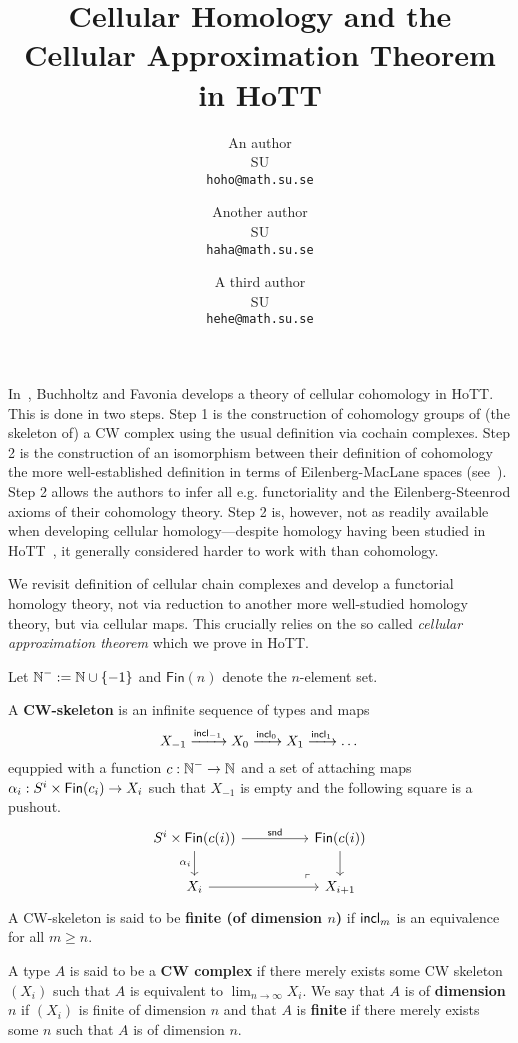 \documentclass[a4page]{article}
\title{Cellular Homology and the Cellular Approximation Theorem in HoTT}
\author{
  An author\\
  \footnotesize{SU}\\
  \footnotesize{\texttt{hoho@math.su.se}}
  \and
  Another author\\
  \footnotesize{SU}\\
  \footnotesize{\texttt{haha@math.su.se}}
  \and
  A third author\\
  \footnotesize{SU}\\
  \footnotesize{\texttt{hehe@math.su.se}}
}
\date{}
\begin{document}
\maketitle

In~\cite{BuchholtzFavonia18}, Buchholtz and Favonia develops a theory
of cellular cohomology in HoTT. This is done in two steps. Step 1 is
the construction of cohomology groups of (the skeleton of) a CW
complex using the usual definition via cochain complexes.  Step 2 is
the construction of an isomorphism between their definition of
cohomology the more well-established definition in terms of
Eilenberg-MacLane spaces (see~\cite{LicataFinster14}). Step 2 allows
the authors to infer all e.g. functoriality and the Eilenberg-Steenrod
axioms of their cohomology theory. Step 2 is, however, not as readily
available when developing cellular homology---despite homology having
been studied in HoTT~\cite{graham18,christensen2020hurewicz}, it
generally considered harder to work with than cohomology. 

We revisit \cite{BuchholtzFavonia18} definition of cellular chain
complexes and develop a functorial homology theory, not via reduction
to another more well-studied homology theory, but via cellular
maps. This crucially relies on the so called \emph{cellular
  approximation theorem} which we prove in HoTT.

Let $\textsf{$\mathbb{N}$}^{-} := \textsf{$\mathbb{N}$} \cup \{-1\}$ and $\mathsf{Fin}(n)$ denote the $n$-element set.
\begin{definition}[CW skeleta]
  A \textbf{CW-skeleton} is an infinite sequence of types and maps
  \[X_{-1} \xrightarrow{\textnormal{\ensuremath{\mathsf{incl}_{-1}}}} X_0 \xrightarrow{\textnormal{\ensuremath{\mathsf{incl}_{0}}}} X_1 \xrightarrow{\textnormal{\ensuremath{\mathsf{incl}_{1}}}} \dots \]
  equppied with a function $c : \textsf{$\mathbb{N}$}^- \to \textsf{$\mathbb{N}$}$ and a set of attaching maps $\alpha_i : S^i \times \textnormal{\ensuremath{\mathsf{Fin}({c_i})}} \to X_i$ such that $X_{-1}$ is empty and the following square is a pushout.
  \[
\begin{tikzcd}[ampersand replacement=\&]
	{S^{i} \times \fin{c(i)}} \&\& \fin{c(i)} \\
	{X_i} \&\& {X_{i+1}}
	\arrow["{\mathsf{snd}}", from=1-1, to=1-3]
	\arrow["{\alpha_{i}}"', from=1-1, to=2-1]
	\arrow[from=2-1, to=2-3]
	\arrow[from=1-3, to=2-3]
	\arrow["\lrcorner"{anchor=center, pos=0.125, rotate=180}, draw=none, from=2-3, to=1-1]
\end{tikzcd}
\]
A CW-skeleton is said to be \textbf{finite (of dimension $n$)} if $\textnormal{\ensuremath{\mathsf{incl}_{m}}}$ is an equivalence for all $m \geq n$.
\end{definition}
\begin{definition}[CW complexes]
  A type $A$ is said to be a \textbf{CW complex} if there merely exists some CW skeleton $(X_i)$ such that $A$ is equivalent to $\lim_{n\to \infty} X_i$. We say that $A$ is of \textbf{dimension $n$} if $(X_i)$ is finite of dimension $n$ and that $A$ is \textbf{finite} if there merely exists some $n$ such that $A$ is of dimension $n$.
\end{definition}
\end{document}
